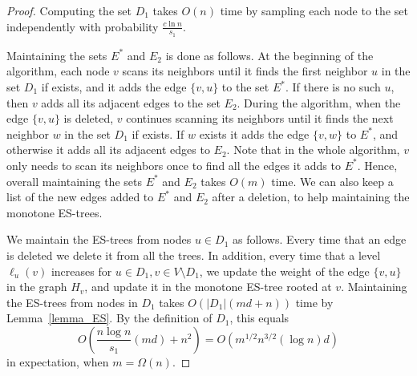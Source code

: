 \begin{proof}
Computing the set $D_1$ takes $O(n)$ time by sampling each node to the set independently with probability $\frac{c \ln{n}}{s_1}$. 

Maintaining the sets $E^*$ and $E_2$ is done as follows. At the beginning of the algorithm, each node $v$ scans its neighbors until it finds the first neighbor $u$ in the set $D_1$ if exists, and it adds the edge $\{v,u\}$ to the set $E^*$. If there is no such $u$, then $v$ adds all its adjacent edges to the set $E_2$.
During the algorithm, when the edge $\{v,u\}$ is deleted, $v$ continues scanning its neighbors until it finds the next neighbor $w$ in the set $D_1$ if exists. If $w$ exists it adds the edge $\{v,w\}$ to $E^*$, and otherwise it adds all its adjacent edges to $E_2$. Note that in the whole algorithm, $v$ only needs to scan its neighbors once to find all the edges it adds to $E^*$. Hence, overall maintaining the sets $E^*$ and $E_2$ takes $O(m)$ time. We can also keep a list of the new edges added to $E^*$ and $E_2$ after a deletion, to help maintaining the monotone ES-trees.

We maintain the ES-trees from nodes $u \in D_1$ as follows. Every time that an edge is deleted we delete it from all the trees. In addition, every time that a level $\ell_u(v)$ increases for $u \in D_1, v \in V \setminus D_1$, we update the weight of the edge $\{v,u\}$ in the graph $H_v$, and update it in the monotone ES-tree rooted at $v$.
Maintaining the ES-trees from nodes in $D_1$ takes $O(|D_1|(md+n))$ time by Lemma~\ref{lemma_ES}. By the definition of $D_1$, this equals $$O \left( \frac{n \log{n}}{s_1} \left( md \right) + n^2 \right) =O(m^{1/2}n^{3/2} (\log{n}) d)$$ in expectation, when $m=\Omega(n).$


\end{proof}
